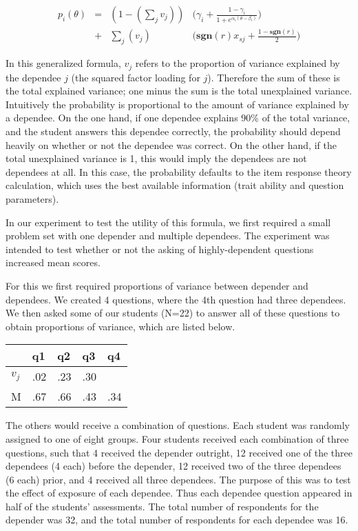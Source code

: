 \begin{align*}
  p_i(\theta) &=& (1- (\displaystyle\sum_j v_j)) & \Big(\gamma_i + \frac{1-\gamma_i}{1+e^{\alpha_i(\theta-\beta_i)}}\Big) \\
              &+& \displaystyle\sum_j (v_j)   & \Big(\mathbf{sgn}(r)x_{sj}+\frac{1-\mathbf{sgn}(r)}{2}\Big)
\end{align*}

In this generalized formula, $v_j$ refers to the proportion of variance
explained by the dependee $j$ (the squared factor loading for $j$).  Therefore
the sum of these is the total explained variance; one minus the sum is the
total unexplained variance.  Intuitively the probability is proportional to the
amount of variance explained by a dependee.  On the one hand, if one dependee
explains 90\% of the total variance, and the student answers this dependee
correctly, the probability should depend heavily on whether or not the dependee
was correct.  On the other hand, if the total unexplained variance is 1, this
would imply the dependees are not dependees at all.  In this case, the
probability defaults to the item response theory calculation, which uses the
best available information (trait ability and question parameters).

In our experiment to test the utility of this formula, we first required a
small problem set with one depender and multiple dependees.  The experiment
was intended to test whether or not the asking of highly-dependent questions
increased mean scores.

For this we first required proportions of variance between depender and
dependees.  We created 4 questions, where the 4th question had three dependees.
We then asked some of our students (N=22) to answer all of these questions to
obtain proportions of variance, which are listed below.  

\begin{center}
\begin{tabular}{|l|l|l|l|l|}
                                  \hline
      &   q1 &  q2  & q3 & q4  \\ \hline
$v_j$ &  .02 & .23 & .30 &     \\ \hline
 M    &  .67 & .66 & .43 & .34 \\ \hline
\end{tabular}
\end{center}

The others would receive a combination of questions.  Each student was randomly
assigned to one of eight groups.  Four students received each combination of
three questions, such that 4 received the depender outright, 12 received one of
the three dependees (4 each) before the depender, 12 received two of the three
dependees (6 each) prior, and 4 received all three dependees.  The purpose of
this was to test the effect of exposure of each dependee.  Thus each dependee
question appeared in half of the students' assessments.  The total number of
respondents for the depender was 32, and the total number of respondents for
each dependee was 16.  

